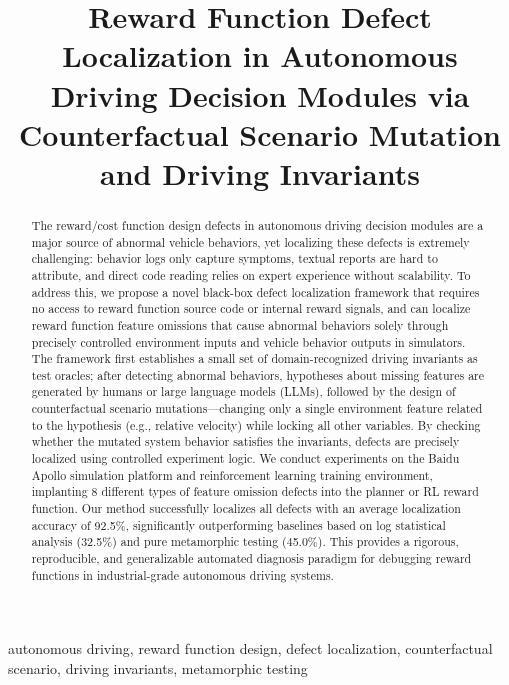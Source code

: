 \documentclass[conference]{IEEEtran}
\title{Reward Function Defect Localization in Autonomous Driving Decision Modules via Counterfactual Scenario Mutation and Driving Invariants}
\author{
\IEEEauthorblockN{Wenjia Niu}
\IEEEauthorblockA{School of Cyberspace Science and Technology \\
Beijing Jiaotong University\\
Beijing, China 100044 \\
Email: Niuwj@bjtu.edu.cn}
}
\theoremstyle{plain}
\begin{document}
\maketitle

\begin{abstract}
The reward/cost function design defects in autonomous driving decision modules are a major source of abnormal vehicle behaviors, yet localizing these defects is extremely challenging: behavior logs only capture symptoms, textual reports are hard to attribute, and direct code reading relies on expert experience without scalability. To address this, we propose a novel black-box defect localization framework that requires no access to reward function source code or internal reward signals, and can localize reward function feature omissions that cause abnormal behaviors solely through precisely controlled environment inputs and vehicle behavior outputs in simulators. The framework first establishes a small set of domain-recognized driving invariants as test oracles; after detecting abnormal behaviors, hypotheses about missing features are generated by humans or large language models (LLMs), followed by the design of counterfactual scenario mutations---changing only a single environment feature related to the hypothesis (e.g., relative velocity) while locking all other variables. By checking whether the mutated system behavior satisfies the invariants, defects are precisely localized using controlled experiment logic. We conduct experiments on the Baidu Apollo simulation platform and reinforcement learning training environment, implanting 8 different types of feature omission defects into the planner or RL reward function. Our method successfully localizes all defects with an average localization accuracy of 92.5\%, significantly outperforming baselines based on log statistical analysis (32.5\%) and pure metamorphic testing (45.0\%). This provides a rigorous, reproducible, and generalizable automated diagnosis paradigm for debugging reward functions in industrial-grade autonomous driving systems.
\end{abstract}

\begin{IEEEkeywords}
autonomous driving, reward function design, defect localization, counterfactual scenario, driving invariants, metamorphic testing
\end{IEEEkeywords}
\end{document}
